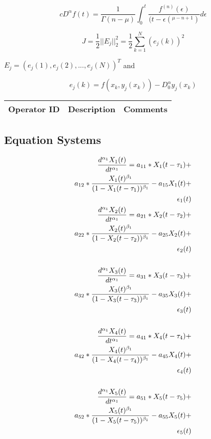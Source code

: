 \begin{equation}
cD^{\alpha} f(t) = \frac{1}{\Gamma(n - \mu)} \int_{0}^{t} \frac{f^{(n)} (\epsilon)}{(t-\epsilon(^{\mu - n + 1})} d\epsilon 
\end{equation}

\begin{equation}
J = \frac{1}{2} || E_{j} ||_{2}^{2} = \frac{1}{2} \sum_{k=1}^{N} (e_j (k))^2 
\end{equation}

$E_j =(e_{j}(1),e_{j}(2),...,e_{j}(N))^{T}$ and

\begin{equation}
e_{j}(k) = f(x_{k},y_{j}(x_{k})) - D_{0}^{\alpha} y_{j}(x_{k})
\end{equation}

\begin{table}[H]\centering
	\begin{tabular}{p{1cm}p{4cm}p{3cm}}
		Operator ID & Description & Comments\\
		\hline
		\hline
	\end{tabular}
\end{table}


\subsection{Equation Systems}

\begin{align*} 
\tiny
\frac{d^{\alpha_1}X_1(t)}{dt^{\alpha_1}} = a_{11} *X_1(t - \tau_1) + \\
a_{12} *\frac{X_1(t)^{\beta_1}}{(1-X_1(t - \tau_1))^{\beta_1}} - a_{15}X_1(t) + \\
\epsilon_1(t) \\
\frac{d^{\alpha_1}X_2(t)}{dt^{\alpha_1}} = a_{21} *X_2(t - \tau_2) + \\
a_{22} *\frac{X_2(t)^{\beta_1}}{(1-X_2(t - \tau_2))^{\beta_1}} - a_{25}X_2(t) + \\
\epsilon_2(t) \\ \\
\frac{d^{\alpha_1}X_3(t)}{dt^{\alpha_1}} = a_{31} *X_3(t - \tau_3) + \\
a_{32} *\frac{X_3(t)^{\beta_1}}{(1-X_3(t - \tau_3))^{\beta_1}} - a_{35}X_3(t) + \\
\epsilon_3(t) \\ \\
\frac{d^{\alpha_1}X_4(t)}{dt^{\alpha_1}} = a_{41} *X_4(t - \tau_4) + \\
a_{42} *\frac{X_4(t)^{\beta_1}}{(1-X_4(t - \tau_4))^{\beta_1}} - a_{45}X_4(t) + \\
\epsilon_4(t) \\ \\
\frac{d^{\alpha_1}X_5(t)}{dt^{\alpha_1}} = a_{51} *X_5(t - \tau_5) + \\
a_{52} *\frac{X_5(t)^{\beta_1}}{(1-X_5(t - \tau_5))^{\beta_1}} - a_{55}X_5(t) + \\
\epsilon_5(t) \\
\end{align*}

